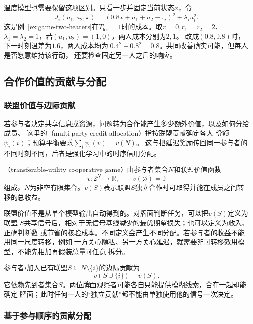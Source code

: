 温度模型也需要保留这项区别。只看一步并固定当前状态\(x\)，令
\[
  J_i(u_1,u_2;x)
  =(0.8x+u_1+u_2-r_i)^2+\lambda_i u_i^2.
\]
这是例~\ref{ex:game-two-heaters}在\(T_{\mathrm{loc}}=1\)时的成本。取\(x=0,r_1=r_2=2\)、
\(\lambda_1=\lambda_2=1\)，若\((u_1,u_2)=(1,0)\)，两人成本分别为\(2,1\)。
改成\((0.8,0.8)\)时，下一时刻温差为\(1.6\)，两人成本均为
\(0.4^2+0.8^2=0.8\)。共同改善确实可能，但每人是否愿意维持该行动，
还要检查固定另一人之后的响应。

\subsection{合作价值的贡献与分配}
\label{sec:game-credit-allocation-multiparty-payoffs}

\subsubsection{联盟价值与边际贡献}
\label{sec:game-coalition-value}

若参与者决定共享信息或资源，问题转为合作能产生多少额外价值，以及如何分给成员。
这里的（multi-party credit allocation）指按联盟贡献确定各人
份额\(\psi_i(v)\)；预算平衡要求\(\sum_i\psi_i(v)=v(N)\)。
这与把延迟奖励传回同一参与者的不同时刻不同，后者是强化学习中的时序信用分配。
\begin{definition}[可转移效用博弈]
\label{def:game-transferable-utility-cooperation}
（transferable-utility cooperative game）由参与者集合\(N\)和联盟价值函数
\[
  v:2^N\to\mathbb{R},\qquad v(\varnothing)=0
\]
组成，$N$为非空有限集合。\(v(S)\)表示联盟\(S\)独立合作时可取得并能在成员之间转移的总收益。
\end{definition}

联盟价值不是从单个模型输出自动得到的。对牌面判断任务，可以把\(v(S)\)定义为联盟
\(S\)共享信号后，相对于无信号基线减少的最优期望损失；也可以定义为收入、正确判断数
或节省的核验成本。不同定义会产生不同分配。若参与者的收益不能用同一尺度转移，例如
一方关心隐私、另一方关心延迟，就需要非可转移效用模型，不能先相加再假装总量可任意
拆分。

参与者\(i\)加入已有联盟\(S\subseteq N\setminus\{i\}\)的边际贡献为
\[
  v(S\cup\{i\})-v(S).
\]
它依赖先到者集合\(S\)。两位牌面观察者可能各自只能提供模糊线索，合在一起却能确定
牌面；此时任何一人的“独立贡献”都不能由单独使用他的信号一次决定。

\subsubsection{基于参与顺序的贡献分配}
\label{sec:game-shapley-order}

